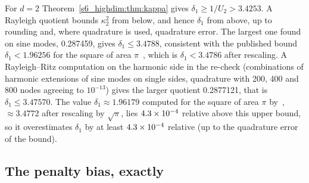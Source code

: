 For $d=2$ Theorem~\ref{s6_highdim:thm:kappa} gives $\delta_1\ge1/U_2>3.4253$. A Rayleigh
quotient bounds $\kappa_2^2$ from below, and hence $\delta_1$ from above, up to rounding and, where
quadrature is used, quadrature error. The largest one found on sine modes, 0.287459, gives
$\delta_1\le3.4788$, consistent with the published bound $\delta_1<1.96256$ for the square of area
$\pi$~\citep{ferrero2005fourth}, which is $\delta_1<3.4786$ after rescaling.
A Rayleigh--Ritz computation on the harmonic side in the re-check (combinations of harmonic
extensions of sine modes on single sides, quadrature with 200, 400 and 800 nodes agreeing to
$10^{-13}$) gives the larger quotient 0.2877121, that is $\delta_1\le3.47570$. The value
$\delta_1\approx1.96179$ computed for the square of area $\pi$ by~\citet{antunes2013convex},
$\approx3.4772$ after rescaling by $\sqrt\pi$, lies $4.3\times 10^{-4}$ relative above this upper
bound, so it overestimates $\delta_1$ by at least $4.3\times 10^{-4}$ relative (up to the quadrature
error of the bound).

\subsection{The penalty bias, exactly}\label{S5:sec:bias}

